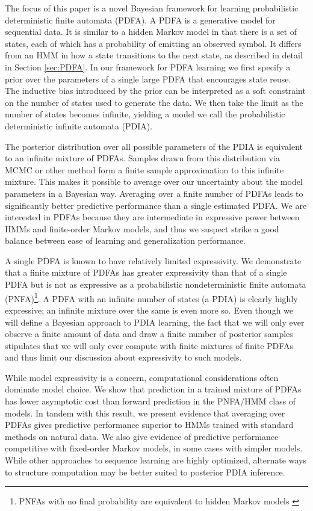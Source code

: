 The focus of this paper is a novel Bayesian framework for learning probabilistic deterministic finite automata (PDFA).  A PDFA is a generative model for sequential data.  It is similar to a hidden Markov model in that there is a set of states, each of which has a probability of emitting an observed symbol.  It differs from an HMM in how a state transitions to the next state, as described in detail in Section \ref{sec:PDFA}.  In our framework for PDFA learning we first specify a prior over the parameters of a single large PDFA that encourages state reuse.  The inductive bias introduced by the prior can be interpreted as a soft constraint on the number of states used to generate the data.  We then take the limit as the number of states becomes infinite, yielding a model we call the probabilistic deterministic infinite automata (PDIA).  

The posterior distribution over all possible parameters of the PDIA is equivalent to an infinite mixture of PDFAs.  Samples drawn from this distribution via MCMC or other method form a finite sample approximation to this infinite mixture.  This makes it possible to average over our uncertainty about the model parameters in a Bayesian way.  Averaging over a finite number of PDFAs leads to significantly better predictive performance than a single estimated PDFA.  We are interested in PDFAs because they are intermediate in expressive power between HMMs and finite-order Markov models, and thus we suspect strike a good balance between ease of learning and generalization performance.

A single PDFA is known to have relatively limited expressivity.  We demonstrate that a finite mixture of PDFAs has greater expressivity than that of a single PDFA but is not as expressive as a probabilistic nondeterministic finite automata (PNFA)\footnote{PNFAs with no final probability are equivalent to hidden Markov models \cite{Dupont2005} \label{fn:pnfa}}.  A PDFA with an infinite number of states (a PDIA) is clearly highly expressive; an infinite mixture over the same is even more so.  Even though we will define a Bayesian approach to PDIA learning, the fact that we will only ever observe a finite amount of data and draw a finite number of posterior samples stipulates that we will only ever compute with finite mixtures of finite PDFAs and thus limit our discussion about expressivity to such models.   

While model expressivity is a concern, computational considerations often dominate model choice.  We show that prediction in a trained mixture of PDFAs has lower asymptotic cost than forward prediction in the PNFA/HMM class of models.   In tandem with this result, we present evidence that averaging over PDFAs gives predictive performance superior to HMMs trained with standard methods on natural data.  We also give evidence of predictive performance competitive with fixed-order Markov models, in some cases with simpler models.  While other approaches to sequence learning are highly optimized, alternate ways to structure computation may be better suited to posterior PDIA inference.

